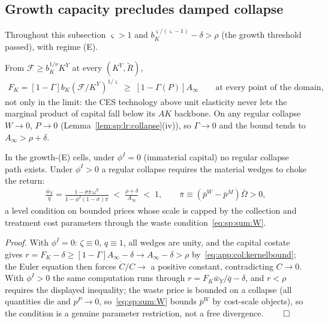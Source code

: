 \subsection{Growth capacity precludes damped collapse}
\label{sec:app:collapse:growthcell}

Throughout this subsection $\varsigma>1$ and $b_K^{\varsigma/\left(\varsigma-1\right)}-\delta>\rho$
(the growth threshold passed), with regime (E).

 From $\mathcal F\ge b_K^{1/\nu}K^Y$ at every
$\left(K^Y,\tilde R\right)$,
\begin{align}
F_K=\left[1-\Gamma\right]b_K\left(\mathcal F/K^Y\right)^{1/\varsigma}
\;\ge\;\left[1-\Gamma\!\left(P\right)\right]A_\infty
\qquad\text{at every point of the domain},
\label{eq:app:col:kernelbound}
\end{align}
not only in the limit: the CES technology above unit elasticity never lets the marginal
product of capital fall below its $AK$ backbone. On any regular collapse $W\to0$, $P\to0$
(Lemma~\ref{lem:sp:lr:collapse}(iv)), so $\Gamma\to0$ and the bound tends to
$A_\infty>\rho+\delta$.

\begin{lemma}\label{lem:app:col:nogrowthcollapse}
In the growth-(E) cells, under $\phi^I=0$ (immaterial capital) no regular collapse path
exists. Under $\phi^I>0$ a regular collapse requires the material wedges to choke the return:
\begin{align}
\frac{\bar w_Y}{\bar q}
=\frac{1-\bar\sigma\bar\pi\,\omega^Y}{1-\phi^I\left(1-\bar\sigma\right)\bar\pi}
\;<\;\frac{\rho+\delta}{A_\infty}\;<\;1,
\qquad
\bar\pi\equiv\left(\bar p^W-\bar p^M\right)\bar\Omega>0,
\label{eq:app:col:wedgechoke}
\end{align}
a level condition on bounded prices whose scale is capped by the collection and treatment
cost parameters through the waste condition~\eqref{eq:sp:sum:W}.
\end{lemma}

\emph{Proof.} With $\phi^I=0$: $\zeta\equiv0$, $q\equiv1$, all wedges are unity, and the
capital costate gives $r=F_K-\delta\ge\left[1-\Gamma\right]A_\infty-\delta\to A_\infty-\delta>\rho$
by~\eqref{eq:app:col:kernelbound}; the Euler equation then forces $\dot C/C\to$ a positive
constant, contradicting $C\to0$. With $\phi^I>0$ the same computation runs through
$r=F_K\bar w_Y/\bar q-\delta$, and $r<\rho$ requires the displayed inequality; the waste
price is bounded on a collapse (all quantities die and $p^P\to0$, so~\eqref{eq:sp:sum:W}
bounds $\bar p^W$ by cost-scale objects), so the condition is a genuine parameter
restriction, not a free divergence. \hfill$\qed$

